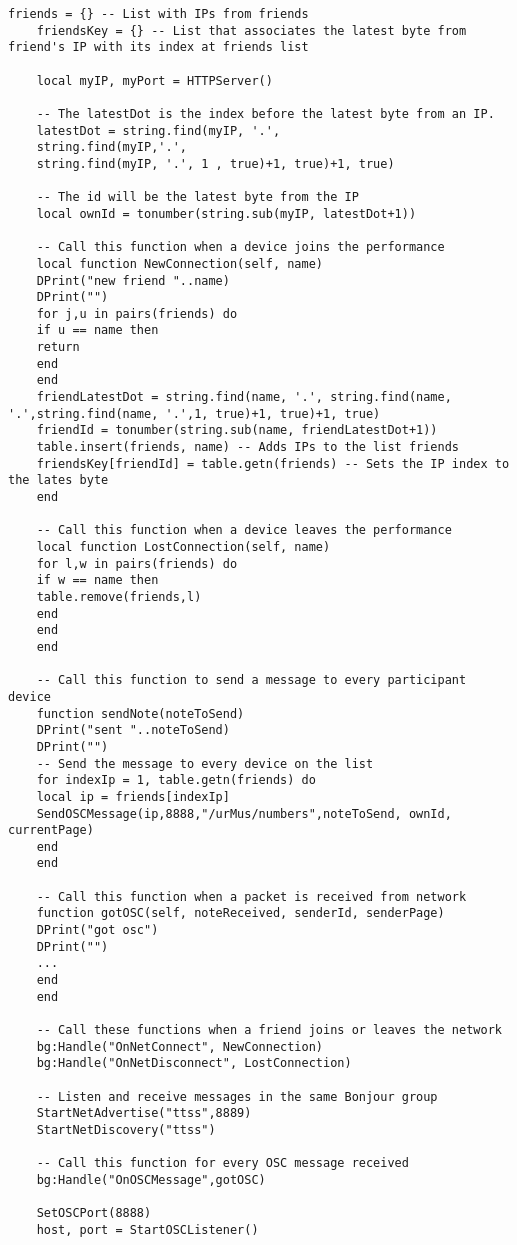 \begin{footnotesize}
	\lstset{language=Java, caption=Example of Lua code used at urMus platform for Multicasting in LAN, captionpos=b, label=urMusLuaMulticast, numbers=none, numberstyle=\scriptsize}
	\begin{lstlisting}[frame=single]
	friends = {} -- List with IPs from friends
	friendsKey = {} -- List that associates the latest byte from friend's IP with its index at friends list
	
	local myIP, myPort = HTTPServer()
	
	-- The latestDot is the index before the latest byte from an IP.
	latestDot = string.find(myIP, '.', 
	string.find(myIP,'.',
	string.find(myIP, '.', 1 , true)+1, true)+1, true)
	
	-- The id will be the latest byte from the IP
	local ownId = tonumber(string.sub(myIP, latestDot+1))
	
	-- Call this function when a device joins the performance
	local function NewConnection(self, name)
	DPrint("new friend "..name)
	DPrint("")
	for j,u in pairs(friends) do
	if u == name then
	return
	end
	end
	friendLatestDot = string.find(name, '.', string.find(name, '.',string.find(name, '.',1, true)+1, true)+1, true)
	friendId = tonumber(string.sub(name, friendLatestDot+1))
	table.insert(friends, name) -- Adds IPs to the list friends
	friendsKey[friendId] = table.getn(friends) -- Sets the IP index to the lates byte
	end
	
	-- Call this function when a device leaves the performance
	local function LostConnection(self, name)
	for l,w in pairs(friends) do
	if w == name then
	table.remove(friends,l)
	end
	end
	end
	
	-- Call this function to send a message to every participant device
	function sendNote(noteToSend)
	DPrint("sent "..noteToSend)
	DPrint("")
	-- Send the message to every device on the list
	for indexIp = 1, table.getn(friends) do
	local ip = friends[indexIp]
	SendOSCMessage(ip,8888,"/urMus/numbers",noteToSend, ownId, currentPage)
	end
	end
	
	-- Call this function when a packet is received from network
	function gotOSC(self, noteReceived, senderId, senderPage)
	DPrint("got osc")
	DPrint("")
	...
	end
	end
	
	-- Call these functions when a friend joins or leaves the network
	bg:Handle("OnNetConnect", NewConnection)
	bg:Handle("OnNetDisconnect", LostConnection)
	
	-- Listen and receive messages in the same Bonjour group
	StartNetAdvertise("ttss",8889)
	StartNetDiscovery("ttss")
	
	-- Call this function for every OSC message received
	bg:Handle("OnOSCMessage",gotOSC)
	
	SetOSCPort(8888)
	host, port = StartOSCListener()
	\end{lstlisting}
\end{footnotesize}

